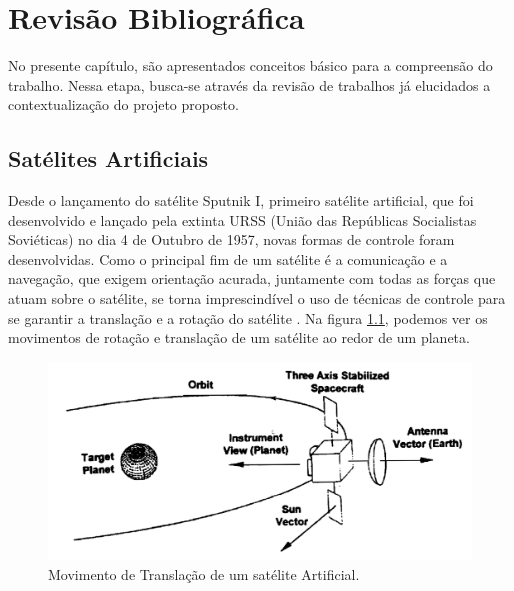 \chapter{Revisão Bibliográfica}

No presente capítulo, são apresentados conceitos básico para a compreensão do trabalho. Nessa etapa, busca-se através da revisão de trabalhos já elucidados a contextualização do projeto proposto.


\section{Satélites Artificiais} %

Desde o lançamento do satélite Sputnik I, primeiro satélite artificial, que foi desenvolvido e lançado pela extinta URSS (União das Repúblicas Socialistas Soviéticas) no dia 4 de Outubro de 1957, novas formas de controle foram desenvolvidas. Como o principal fim de um satélite é a comunicação e a navegação, que exigem orientação acurada, juntamente com todas as forças que atuam sobre o satélite, se torna imprescindível o uso de técnicas de controle para se garantir a translação e a rotação do satélite \cite{Brown2002}. Na figura \ref{fig:rotational_brown_p256}, podemos ver os movimentos de rotação e translação de um satélite ao redor de um planeta.

\begin{figure}[!ht]
  \caption{Movimento de Translação de um satélite Artificial.}
  \begin{center}
      \includegraphics[scale=0.5]{img/rotational_brown_p256}
  \end{center}
  \label{fig:rotational_brown_p256}
\end{figure}

